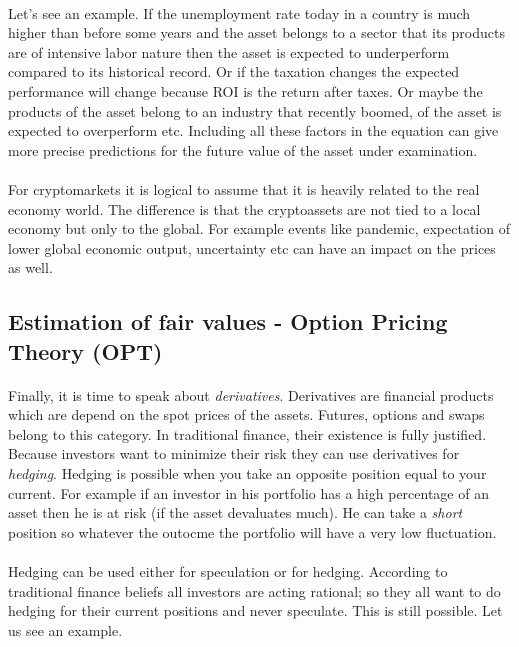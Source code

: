 \documentclass{article}
\begin{document}
\paragraph{ }
Let's see an example. If the unemployment rate today in a country is much higher than before some years and the asset belongs to a sector that its products are of intensive labor nature then the asset is expected to underperform compared to its historical record. Or if the taxation changes the expected performance will change because ROI is the return after taxes. Or maybe the products of the asset belong to an industry that recently boomed, of the asset is expected to overperform etc. Including all these factors in the equation can give more precise predictions for the future value of the asset under examination.
\paragraph{ }
For cryptomarkets it is logical to assume that it is heavily related to the real economy world. The difference is that the cryptoassets are not tied to a local economy but only to the global. For example events like pandemic, expectation of lower global economic output, uncertainty etc can have an impact on the prices as well.

\subsection{Estimation of fair values - Option Pricing Theory (OPT)}
\paragraph{ }
Finally, it is time to speak about \emph{derivatives}. Derivatives are financial products which are depend on the spot prices of the assets. Futures, options and swaps belong to this category. In traditional finance, their existence is fully justified. Because investors want to minimize their risk they can use derivatives for \emph{hedging}. Hedging is possible when you take an opposite position equal to your current. For example if an investor in his portfolio has a high percentage of an asset then he is at risk (if the asset devaluates much). He can take a \emph{short} position so whatever the outocme the portfolio will have a very low fluctuation.
\paragraph{ }
Hedging can be used either for speculation or for hedging. According to traditional finance beliefs all investors are acting rational; so they all want to do hedging for their current positions and never speculate. This is still possible. Let us see an example.
\end{document}
